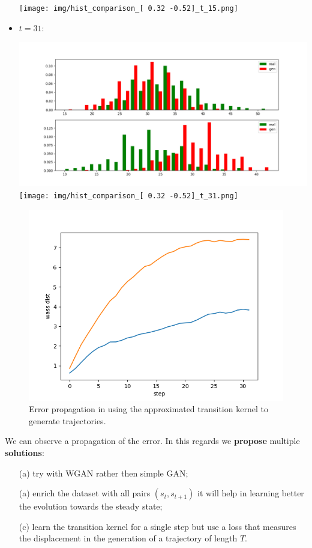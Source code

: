 \documentclass{article}
\begin{document}
\begin{itemize}
\begin{center}
        \texttt{[image: img/hist\_comparison\_[  0.32 -0.52]\_t\_15.png]}
    \end{center}
    \item $t = 31$:
        \begin{center}
        \includegraphics[scale = 0.18]{img/hist_comparison_[ 0.04 -0.08]_t_31.png}
        \texttt{[image: img/hist\_comparison\_[  0.32 -0.52]\_t\_31.png]}
    \end{center}
\end{itemize}

\begin{figure}[hb]
    \centering
    \includegraphics[scale = 0.4]{img/avg_wass_distance_32steps.png}
    \caption{Error propagation in using the approximated transition kernel to generate trajectories.}
    \label{fig:error_prop}
\end{figure}

We can observe a propagation of the error. In this regards we \textbf{propose} multiple \textbf{solutions}:
\begin{itemize}
    \item[(a)] try with WGAN rather then simple GAN;
    \item[(a)] enrich the dataset with all pairs $(s_t, s_{t+1})$ it will help in learning better the evolution towards the steady state;
    \item[(c)] learn the transition kernel for a single step but use a loss that measures the displacement in the generation of a trajectory of length $T$.
    
\end{itemize}
\end{document}

